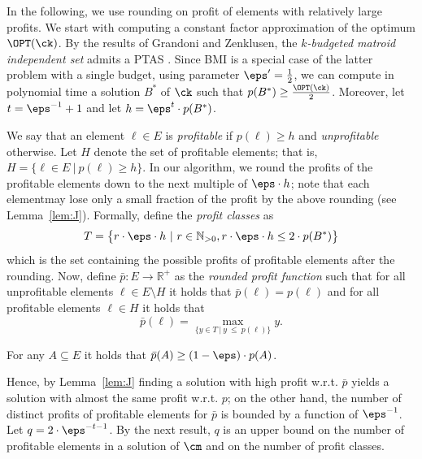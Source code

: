 In the following, we use rounding on profit of elements with relatively large profits. We start with computing a constant factor approximation of the optimum $\OPT(\ck)$. By the results of Grandoni and Zenklusen, the {\em $k$-budgeted matroid independent set} admits a PTAS \cite{grandoni2010approximation}. Since BMI is a special case of the latter problem with a single budget, using parameter $\eps' = \frac{1}{2}$, we can compute in polynomial time a solution $B^*$ of $\ck$ such that $p(B^*) \geq \frac{\OPT(\ck)}{2}$. Moreover, let $t = \eps^{-1}+1$ and let $h = \eps^t \cdot p(B^*)$. 

We say that an element $\ell \in E$ is {\em profitable} if $p(\ell) \geq h$ and {\em unprofitable} otherwise. Let $H$ denote the set of profitable elements; that is, $H = \{\ell \in E~|~ p(\ell) \geq h\}$. In our algorithm, we round the profits of the profitable elements down to the next multiple of $\eps \cdot h$; note that each elementmay lose only a small fraction of the profit by the above rounding (see Lemma~\ref{lem:J}). Formally, define the {\em profit classes} as $$T = \big\{r \cdot \eps \cdot h ~|~r \in \mathbb{N}_{>0}, r \cdot \eps \cdot h \leq 2 \cdot p(B^*)\big\}$$ which is the set containing the possible profits of profitable elements after the rounding. Now, define $\bar{p}: E \rightarrow \mathbb{R}^+$ as the {\em rounded profit function} such that for all unprofitable elements $\ell \in E \setminus H$ it holds that $\bar{p}(\ell) = p(\ell)$ and for all profitable elements $\ell \in H$ it holds that \begin{equation}
	\label{eq:max}
	\bar{p}(\ell) = \max_{\{y \in T~|~ y ~\leq ~ p(\ell)\}} y.
\end{equation} %


\begin{lemma}
	\label{lem:J}
	For any $A \subseteq E$ it holds that $\bar{p}(A) \geq (1-\eps) \cdot p(A)$. 
\end{lemma} 




Hence, by Lemma~\ref{lem:J} finding a solution with high profit w.r.t. $\bar{p}$ yields a solution with almost the same profit w.r.t. $p$; on the other hand, the number of distinct profits of profitable elements for $\bar{p}$ is bounded by a function of $\eps^{-1}$. Let $q = 2 \cdot \eps^{-t-1}$. By the next result, $q$ is an upper bound on the number of profitable elements in a solution of $\cm$ and on the number of profit classes. 

